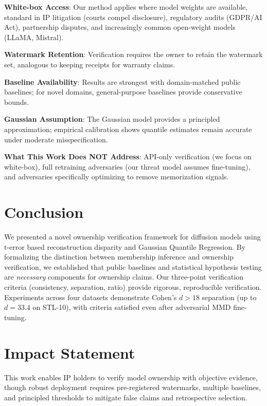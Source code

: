 \documentclass{article}
\begin{document}
\textbf{White-box Access}: Our method applies where model weights are available, standard in IP litigation (courts compel disclosure), regulatory audits (GDPR/AI Act), partnership disputes, and increasingly common open-weight models (LLaMA, Mistral).

\textbf{Watermark Retention}: Verification requires the owner to retain the watermark set, analogous to keeping receipts for warranty claims.

\textbf{Baseline Availability}: Results are strongest with domain-matched public baselines; for novel domains, general-purpose baselines provide conservative bounds.

\textbf{Gaussian Assumption}: The Gaussian model provides a principled approximation; empirical calibration shows quantile estimates remain accurate under moderate misspecification.

\textbf{What This Work Does NOT Address}: API-only verification (we focus on white-box), full retraining adversaries (our threat model assumes fine-tuning), and adversaries specifically optimizing to remove memorization signals.

\section{Conclusion}
\label{sec:conclusion}

We presented a novel ownership verification framework for diffusion models using t-error based reconstruction disparity and Gaussian Quantile Regression.
By formalizing the distinction between membership inference and ownership verification, we established that public baselines and statistical hypothesis testing are \emph{necessary} components for ownership claims.
Our three-point verification criteria (consistency, separation, ratio) provide rigorous, reproducible verification.
Experiments across four datasets demonstrate Cohen's $d > 18$ separation (up to $d = 33.4$ on STL-10), with criteria satisfied even after adversarial MMD fine-tuning.

\section*{Impact Statement}
This work enables IP holders to verify model ownership with 
objective evidence, though robust deployment requires 
pre-registered watermarks, multiple baselines, and principled 
thresholds to mitigate false claims and retrospective selection.


\end{document}
